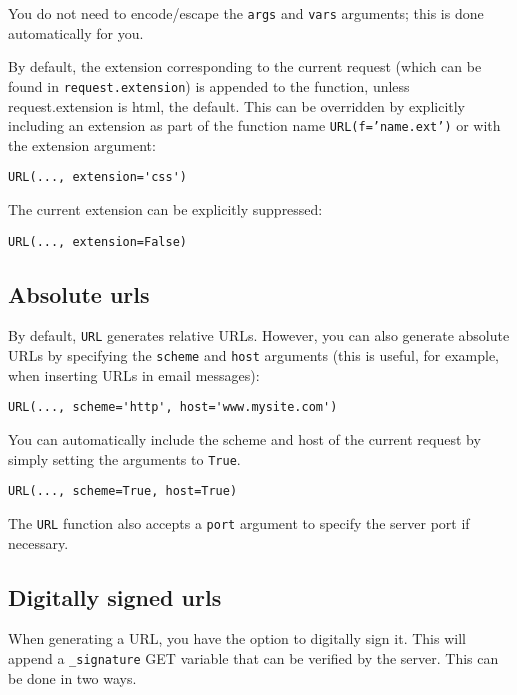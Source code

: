 \documentclass[justified,sixbynine,notoc]{tufte-book}
\def\ft{\small\tt}
\def\inxx#1{\index{#1}}
\begin{document}
\begin{fullwidth}
You do not need to encode/escape the {\ft args} and {\ft vars} arguments; this is done automatically for you.

By default, the extension corresponding to the current request (which can be found in {\ft request.extension}) is appended to the function, unless request.extension is html, the default. This can be overridden by explicitly including an extension as part of the function name {\ft URL(f='name.ext')} or with the extension argument:
\begin{lstlisting}
URL(..., extension='css')
\end{lstlisting}

The current extension can be explicitly suppressed:
\begin{lstlisting}
URL(..., extension=False)
\end{lstlisting}

\goodbreak\subsection{Absolute urls}

By default, {\ft URL} generates relative URLs. However, you can also generate absolute URLs by specifying the {\ft scheme} and {\ft host} arguments (this is useful, for example, when inserting URLs in email messages):

\begin{lstlisting}
URL(..., scheme='http', host='www.mysite.com')
\end{lstlisting}

You can automatically include the scheme and host of the current request by simply setting the arguments to {\ft True}.

\begin{lstlisting}
URL(..., scheme=True, host=True)
\end{lstlisting}

The {\ft URL} function also accepts a {\ft port} argument to specify the server port if necessary.

\goodbreak\subsection{Digitally signed urls}

\inxx{digitally signed URL}

When generating a URL, you have the option to digitally sign it. This will append a {\ft \_signature} GET variable that can be verified by the server. This can be done in two ways.


\end{fullwidth}
\end{document}
